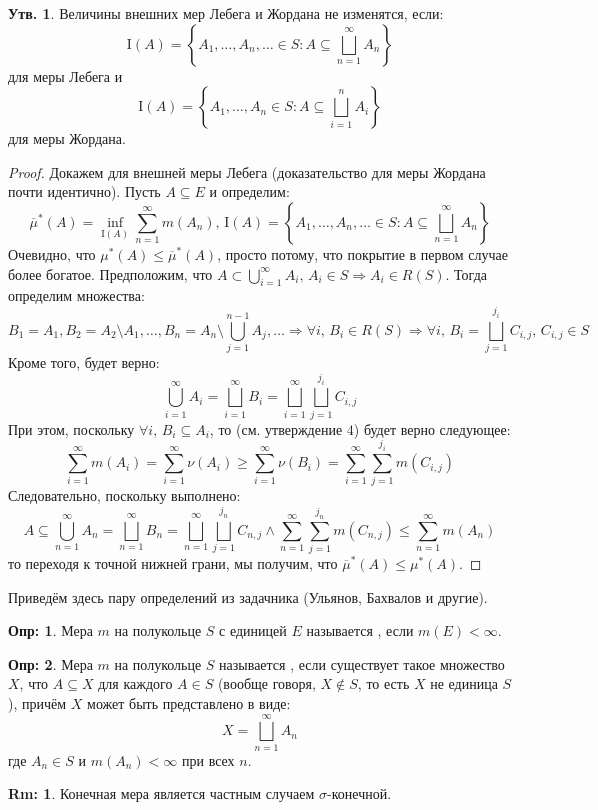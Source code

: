 \documentclass[12pt]{article}
\newcommand{\MI}{\mathrm{I}}
\theoremstyle{definition}
\newtheorem{defn}{Опр:}
\newtheorem{rem}{Rm:}
\newtheorem{prop}{Утв.}
\begin{document}
\begin{prop}
	Величины внешних мер Лебега и Жордана не изменятся, если:
	$$
		\MI(A) = \left\{A_1, \dotsc, A_n, \dotsc \in S \colon A \subseteq \bigsqcup\limits_{n = 1}^{\infty}A_n \right\} 
	$$
	для меры Лебега и 
	$$
		\MI(A) = \left\{A_1, \dotsc, A_n \in S \colon A \subseteq \bigsqcup\limits_{i = 1}^{n}A_i \right\} 
	$$
	для меры Жордана.
\end{prop}
\begin{proof}
	Докажем для внешней меры Лебега (доказательство для меры Жордана почти идентично). Пусть $A \subseteq E$ и определим:
	$$
		\overline{\mu}^*(A) = \inf\limits_{\MI(A)}\sum\limits_{n = 1}^{\infty}m(A_n), \, \MI(A) = \left\{A_1, \dotsc, A_n, \dotsc \in S \colon A \subseteq \bigsqcup\limits_{n = 1}^{\infty}A_n \right\} 
	$$
	Очевидно, что $\mu^*(A) \leq \overline{\mu}^*(A)$, просто потому, что покрытие в первом случае более богатое. Предположим, что $A \subset \bigcup\limits_{i = 1}^{\infty}A_i, \, A_i \in S \Rightarrow A_i \in R(S)$. Тогда определим множества:
	$$
		B_1 = A_1, B_2 = A_2 \setminus A_1, \dotsc, B_n = A_n \setminus \bigcup\limits_{j = 1}^{n-1}A_j, \dotsc \Rightarrow \forall i,\, B_i \in R(S) \Rightarrow \forall i,\, B_i = \bigsqcup\limits_{j = 1}^{j_i}C_{i,j}, \, C_{i,j} \in S
	$$
	Кроме того, будет верно: 
	$$
		\bigcup\limits_{i = 1}^{\infty}A_i = \bigsqcup\limits_{i = 1}^{\infty} B_i = \bigsqcup\limits_{i = 1}^{\infty}\bigsqcup\limits_{j = 1}^{j_i}C_{i,j} 
	$$
	При этом, поскольку $\forall i, \, B_i \subseteq A_i$, то (см. утверждение $4$) будет верно следующее:
	$$
		\sum\limits_{i = 1}^{\infty}m(A_i) = \sum\limits_{i = 1}^{\infty}\nu(A_i) \geq \sum\limits_{i = 1}^{\infty}\nu(B_i) = \sum\limits_{i = 1}^{\infty}\sum\limits_{j = 1}^{j_i}m(C_{i,j})
	$$
	Следовательно, поскольку выполнено:
	$$
		A \subseteq \bigcup\limits_{n = 1}^{\infty}A_n = \bigsqcup\limits_{n = 1}^{\infty} B_n = \bigsqcup\limits_{n = 1}^{\infty}\bigsqcup\limits_{j = 1}^{j_n}C_{n,j} \wedge \sum\limits_{n = 1}^{\infty}\sum\limits_{j = 1}^{j_n}m(C_{n,j}) \leq \sum\limits_{n = 1}^{\infty}m(A_n)
	$$
	то переходя к точной нижней грани, мы получим, что $\overline{\mu}^*(A) \leq \mu^*(A)$.
\end{proof}

Приведём здесь пару определений из задачника (Ульянов, Бахвалов и другие).
\begin{defn}
	Мера $m$ на полукольце $S$ с единицей $E$ называется , если $m(E) < \infty$.
\end{defn}

\begin{defn}
	Мера $m$ на полукольце $S$ называется , если существует такое множество $X$, что $A \subseteq X$ для каждого $A \in S$ (вообще говоря, $X \not\in S$, то есть $X$ не единица $S$), причём $X$ может быть представлено в виде:
	$$
		X = \bigsqcup\limits_{n = 1}^{\infty}A_n
	$$
	где $A_n \in S$ и $m(A_n) < \infty$ при всех $n$.
\end{defn}
\begin{rem}
	Конечная мера является частным случаем $\sigma$-конечной.
\end{rem}
\end{document}
